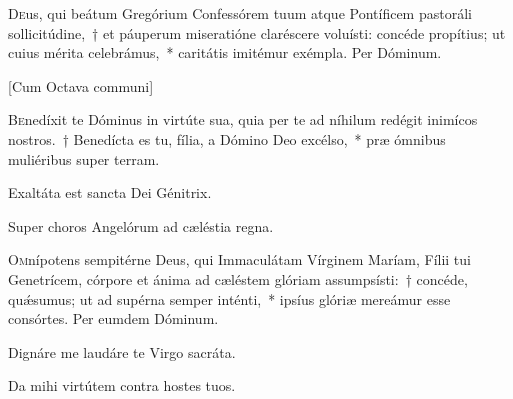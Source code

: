 \documentclass[vesperale_romanum.tex]{subfiles}
\begin{document}
 
 \oratio
\lettrine{D}{e}us, qui beátum Gregórium Confessórem tuum atque Pontíficem pastoráli sollicitúdine,~† et páuperum miseratióne claréscere voluísti: concéde propítius; ut cuius mérita celebrámus,~* caritátis imitémur exémpla.
Per Dóminum.

\newpage
{}

[Cum Octava communi]



\lettrine{B}{e}nedíxit te Dóminus in virtúte sua, quia per te ad níhilum redégit inimícos nostros.~† Benedícta es tu, fília, a Dómino Deo excélso,~* præ ómnibus muliéribus super terram.


\hymnus


\vv Exaltáta est sancta Dei Génitrix.

\rr Super choros Angelórum ad cæléstia regna.

\oratio

\lettrine{O}{m}nípotens sempitérne Deus, qui Immaculátam Vírginem Maríam, Fílii tui Genetrícem, córpore et ánima ad cæléstem glóriam assumpsísti:~† concéde, quǽsumus; ut ad supérna semper inténti,~* ipsíus glóriæ mereámur esse consórtes. Per eumdem Dóminum.
 


 


\vv Dignáre me laudáre te Virgo sacráta. %

\rr Da mihi virtútem contra hostes tuos.

\end{document}
